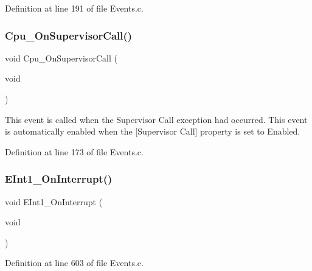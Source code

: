 Definition at line 191 of file Events.\+c.

\mbox{\label{group___events__module_ga428b28484a15546393b77d621e3f074d}} 
\subsubsection{\texorpdfstring{Cpu\+\_\+\+On\+Supervisor\+Call()}{Cpu\_OnSupervisorCall()}}
{\footnotesize\ttfamily void Cpu\+\_\+\+On\+Supervisor\+Call (\begin{DoxyParamCaption}\item[{void}]{ }\end{DoxyParamCaption})}



This event is called when the Supervisor Call exception had occurred. This event is automatically enabled when the \mbox{[}Supervisor Call\mbox{]} property is set to \textquotesingle{}Enabled\textquotesingle{}. 



Definition at line 173 of file Events.\+c.

\mbox{\label{group___events__module_gabdbc35f3567d6a158efe42b38f2ee47a}} 
\subsubsection{\texorpdfstring{E\+Int1\+\_\+\+On\+Interrupt()}{EInt1\_OnInterrupt()}}
{\footnotesize\ttfamily void E\+Int1\+\_\+\+On\+Interrupt (\begin{DoxyParamCaption}\item[{void}]{ }\end{DoxyParamCaption})}



Definition at line 603 of file Events.\+c.

